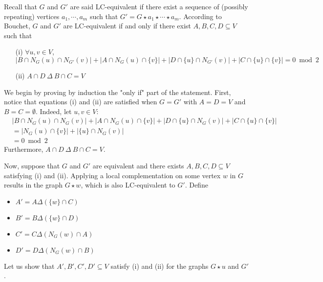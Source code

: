 \documentclass[a4paper,UKenglish,cleveref,autoref,thm-restate]{arxiv}
\begin{document}
Recall that $G$ and $G'$ are said LC-equivalent if there exist a sequence of (possibly repeating) vertices $a_1, \cdots, a_m$ such that $G' = G \star a_1 \star \cdots \star a_m$.
According to Bouchet, $G$ and $G'$ are LC-equivalent if and only if there exist $A,B,C,D\subseteq V$ such that
\begin{itemize}
\item[(i)] $\forall u,v \in V$,\\
$|B\cap N_G(u)\cap N_{G'}(v)| + |A\cap N_G(u)\cap \{v\}| +  |D\cap \{u\}\cap N_{G'}(v)| + |C\cap \{u\}\cap \{v\}| = 0\bmod 2$
\item[(ii)]
$A\cap D~\Delta~ B\cap C = V$
\end{itemize}

We begin by proving by induction the "only if" part of the statement. First, notice that equations (i) and (ii) are satisfied when $G = G'$ with $A = D = V$ and $B = C =  \emptyset$. Indeed, let $u,v \in V$:
\begin{align*}
    & |B\cap N_G(u)\cap N_{G}(v)| + |A\cap N_G(u)\cap \{v\}| +  |D\cap \{u\}\cap N_{G}(v)| + |C\cap \{u\}\cap \{v\}|\\
    &= |N_G(u)\cap \{v\}| +  |\{u\}\cap N_{G}(v)|\\
    &= 0 \bmod 2
\end{align*}
Furthermore, $A\cap D~\Delta~ B\cap C = V$.

Now, suppose that $G$ and $G'$ are equivalent and there exists $A,B,C,D\subseteq V$  satisfying (i) and (ii). Applying a local complementation on some vertex $w$ in $G$ results in the graph $G \star w$, which is also LC-equivalent to $G'$. Define 
\begin{itemize}
    \item $A' = A \Delta ( \{w\}\cap C)$
    \item $B' = B \Delta ( \{w\}\cap D)$
    \item $C' = C \Delta ( N_{G}(w)\cap A)$
    \item $D' = D \Delta ( N_{G}(w)\cap B)$
\end{itemize}
Let us show that $A',B',C',D'\subseteq V$  satisfy (i) and (ii) for the graphs $G \star u$ and $G'$.

\end{document}
